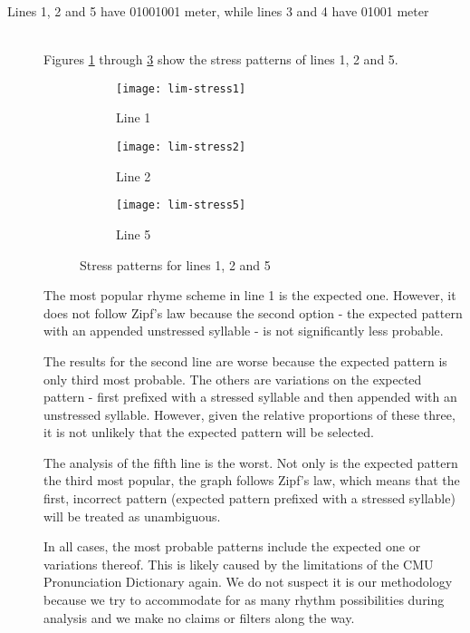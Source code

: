 \begin{description}
\item[Lines 1, 2 and 5 have 01001001 meter, while lines 3 and 4 have 01001 meter]  \hfill \\
Figures \ref{fig:lim-stress1} through \ref{fig:lim-stress5} show the stress patterns of lines 1, 2 and 5.

\begin{figure}[H]
\centering
\begin{subfigure}[t]{0.5\textwidth}
	\centering
    \texttt{[image: lim-stress1]}
    \caption{Line 1}
    \label{fig:lim-stress1}
\end{subfigure}
\begin{subfigure}[t]{0.5\textwidth}
	\centering
    \texttt{[image: lim-stress2]}
    \caption{Line 2}
    \label{fig:lim-stress2}
\end{subfigure}
\begin{subfigure}[t]{0.9\textwidth}
	\centering
    \texttt{[image: lim-stress5]}
    \caption{Line 5}
    \label{fig:lim-stress5}
\end{subfigure}
\caption{Stress patterns for lines 1, 2 and 5}
\label{fig:lim3}
\end{figure}

The most popular rhyme scheme in line 1 is the expected one. However, it does not follow Zipf's law because the second option - the expected pattern with an appended unstressed syllable - is not significantly less probable.

The results for the second line are worse because the expected pattern is only third most probable. The others are variations on the expected pattern - first prefixed with a stressed syllable and then appended with an unstressed syllable. However, given the relative proportions of these three, it is not unlikely that the expected pattern will be selected.

The analysis of the fifth line is the worst. Not only is the expected pattern the third most popular, the graph follows Zipf's law, which means that the first, incorrect pattern (expected pattern prefixed with a stressed syllable) will be treated as unambiguous.

In all cases, the most probable patterns include the expected one or variations thereof. This is likely caused by the limitations of the CMU Pronunciation Dictionary again. We do not suspect it is our methodology because we try to accommodate for as many rhythm possibilities during analysis and we make no claims or filters along the way. 


\end{description}
